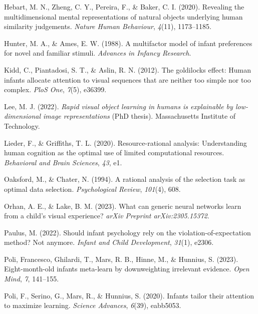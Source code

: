 \documentclass[10pt, letterpaper]{article}
\newenvironment{CSLReferences}%
  {}%
  {\par}
\begin{document}
\begin{CSLReferences}{1}{0}
\leavevmode{}%
Hebart, M. N., Zheng, C. Y., Pereira, F., \& Baker, C. I. (2020).
Revealing the multidimensional mental representations of natural objects
underlying human similarity judgements. \emph{Nature Human Behaviour},
\emph{4}(11), 1173--1185.

\leavevmode{}%
Hunter, M. A., \& Ames, E. W. (1988). A multifactor model of infant
preferences for novel and familiar stimuli. \emph{Advances in Infancy
Research}.

\leavevmode{}%
Kidd, C., Piantadosi, S. T., \& Aslin, R. N. (2012). The goldilocks
effect: Human infants allocate attention to visual sequences that are
neither too simple nor too complex. \emph{PloS One}, \emph{7}(5),
e36399.

\leavevmode{}%
Lee, M. J. (2022). \emph{Rapid visual object learning in humans is
explainable by low-dimensional image representations} (PhD thesis).
Massachusetts Institute of Technology.

\leavevmode{}%
Lieder, F., \& Griffiths, T. L. (2020). Resource-rational analysis:
Understanding human cognition as the optimal use of limited
computational resources. \emph{Behavioral and Brain Sciences},
\emph{43}, e1.

\leavevmode{}%
Oaksford, M., \& Chater, N. (1994). A rational analysis of the selection
task as optimal data selection. \emph{Psychological Review},
\emph{101}(4), 608.

\leavevmode{}%
Orhan, A. E., \& Lake, B. M. (2023). What can generic neural networks
learn from a child's visual experience? \emph{arXiv Preprint
arXiv:2305.15372}.

\leavevmode{}%
Paulus, M. (2022). Should infant psychology rely on the
violation-of-expectation method? Not anymore. \emph{Infant and Child
Development}, \emph{31}(1), e2306.

\leavevmode{}%
Poli, Francesco, Ghilardi, T., Mars, R. B., Hinne, M., \& Hunnius, S.
(2023). Eight-month-old infants meta-learn by downweighting irrelevant
evidence. \emph{Open Mind}, \emph{7}, 141--155.

\leavevmode{}%
Poli, F., Serino, G., Mars, R., \& Hunnius, S. (2020). Infants tailor
their attention to maximize learning. \emph{Science Advances},
\emph{6}(39), eabb5053.


\end{CSLReferences}
\end{document}
